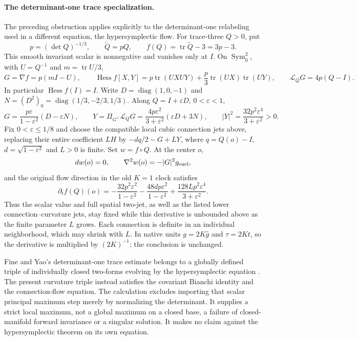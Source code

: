 \documentclass[11pt]{article}
\numberwithin{equation}{section}
\theoremstyle{definition}
\theoremstyle{remark}
\DeclareMathOperator{\tr}{tr}
\DeclareMathOperator{\Sym}{Sym}
\begin{document}
\paragraph{The determinant-one trace specialization.}
The preceding obstruction applies explicitly to the determinant-one
relabeling used in a different equation, the hypersymplectic flow.
For trace-three \(Q>0\), put
\[
 p=(\det Q)^{-1/3},\qquad \widetilde Q=pQ,\qquad
 f(Q)=\tr\widetilde Q-3=3p-3 .
\]
This smooth invariant scalar is nonnegative and vanishes only at \(I\).
On \(\Sym^2_0\), with \(U=Q^{-1}\) and \(m=\tr U/3\),
\[
 G=\nabla f=p(mI-U),\qquad
 \operatorname{Hess}f[X,Y]
   =p\tr(UXUY)+\frac p3\tr(UX)\tr(UY),\qquad
 \mathscr L_QG=4p(Q-I).
\]
In particular \(\operatorname{Hess}f(I)=I\). Write
\(D=\operatorname{diag}(1,0,-1)\) and
\(N=(D^2)_0=\operatorname{diag}(1/3,-2/3,1/3)\).
Along \(Q=I+\varepsilon D\), \(0<\varepsilon<1\),
\[
 G=\frac{p\varepsilon}{1-\varepsilon^2}(D-\varepsilon N),
 \qquad
 Y=\Pi_{G^\perp}\mathscr L_QG
   =\frac{4p\varepsilon^2}{3+\varepsilon^2}(\varepsilon D+3N),
 \qquad
 |Y|^2=\frac{32p^2\varepsilon^4}{3+\varepsilon^2}>0 .
\]
Fix \(0<\varepsilon\le1/8\) and choose the compatible local
cubic connection jets above, replacing their entire coefficient
\(LH\) by \(-dq/2-G+LY\), where \(q=Q(o)-I\),
\(d=\sqrt{1-\varepsilon^2}\) and \(L>0\) is finite.
Set \(w=f\circ Q\). At the center \(o\),
\[
 dw(o)=0,\qquad \nabla^2w(o)=-|G|^2g_{\rm eucl},
\]
and the original flow direction in the old \(K=1\) clock satisfies
\[
 \partial_t f(Q)(o)
 =-\frac{32p^2\varepsilon^2}{1-\varepsilon^2}
   -\frac{48dp\varepsilon^2}{1-\varepsilon^2}
   +\frac{128Lp^2\varepsilon^4}{3+\varepsilon^2}.
\]
Thus the scalar value and full spatial two-jet, as well as the
listed lower connection--curvature jets, stay fixed while this
derivative is unbounded above as the finite parameter \(L\) grows.
Each connection is definite in an individual neighborhood, which
may shrink with \(L\). In native units \(g=2K\widehat g\) and
\(\tau=2Kt\), so the derivative is multiplied by \((2K)^{-1}\);
the conclusion is unchanged.

Fine and Yao's determinant-one trace estimate belongs to a
globally defined triple of individually closed two-forms evolving
by the hypersymplectic equation
\cite[Proposition 3.2, (3.10), and Theorem 4.7]{FineYao2020HypersymplecticReport}.
The present curvature triple instead satisfies the covariant
Bianchi identity and the connection-flow equation. The calculation
excludes importing that scalar principal maximum step merely by
normalizing the determinant. It supplies a strict local maximum,
not a global maximum on a closed base, a failure of closed-manifold
forward invariance or a singular solution. It makes no claim
against the hypersymplectic theorem on its own equation.
\end{document}
